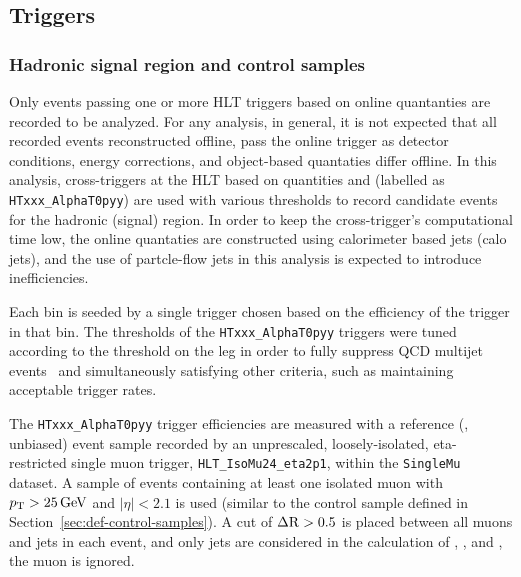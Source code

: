 \subsection{Triggers}

\subsubsection{Hadronic signal region and control samples\label{sec:signal_triggers}} 

Only events passing one or more HLT triggers based on online quantanties 
are recorded to be analyzed. For any analysis, in general, it is 
not expected that all recorded events reconstructed offline, pass the online
trigger as detector conditions, energy corrections, and object-based quantaties
differ offline. In this analysis, cross-triggers at the HLT
based on quantities \scalht and \alphat (labelled as \verb!HTxxx_AlphaT0pyy!) 
are used with various thresholds to record candidate events for the hadronic (signal)
region. In order to keep the cross-trigger's computational time low, the online quantaties
are constructed using calorimeter based jets (calo jets), and the use of
partcle-flow jets in this analysis is expected to introduce inefficiencies.

Each \scalht bin is seeded by a single trigger chosen based on the
efficiency of the trigger in that \scalht bin. The \alphat thresholds of the
\verb!HTxxx_AlphaT0pyy! triggers were tuned according to the threshold
on the \scalht leg in order to fully suppress QCD multijet events~\cite{RA1Paper2012}
and simultaneously satisfying other criteria, such as maintaining
acceptable trigger rates.



%
The \verb!HTxxx_AlphaT0pyy! trigger efficiencies are measured with a
reference (\ie, unbiased) event sample recorded by an unprescaled,
loosely-isolated, eta-restricted single muon trigger,
\verb!HLT_IsoMu24_eta2p1!, within the \verb!SingleMu! dataset. A
sample of events containing at least one isolated muon with $p_{\mathrm{T}} >
25\,\text{Ge\hspace{-.08em}V}$ and $|\eta| < 2.1$ is used (similar to the \mj control sample
defined in Section~\ref{sec:def-control-samples}). A cut of $\Delta
{\rm R} > 0.5$ is placed between all muons and jets in each event, and
only jets are considered in the calculation of \scalht, \mht, and
\alphat, \ie the muon is ignored.

